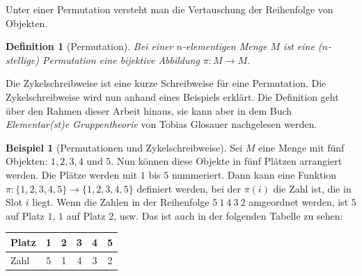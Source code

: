 \documentclass[12pt,a4paper, usenames, dvipsnames]{article}
\theoremstyle{mystyle}
\newtheorem{definition}{Definition}
\theoremstyle{definition}
\newtheorem{bsp}{Beispiel}[definition]
\begin{document}
Unter einer Permutation versteht man die Vertauschung der Reihenfolge von Objekten.

\begin{definition}[Permutation]
Bei einer $n$-elementigen Menge $M$ ist eine ($n$-stellige) Permutation eine bijektive Abbildung $\pi  : M \rightarrow M$.
\end{definition}
Die Zykelschreibweise ist eine kurze Schreibweise für eine Permutation.
Die Zykelschreibweise wird nun anhand eines Beispiels erklärt. Die Definition geht über den Rahmen dieser Arbeit hinaus, sie kann aber in dem Buch \textit{Elementar(st)e Gruppentheorie} von Tobias Glosauer \cite{Buch} nachgelesen werden.

\begin{bsp}[Permutationen und Zykelschreibweise]
Sei $M$ eine Menge mit fünf Objekten: $1, 2, 3, 4$ und $5$. Nun können diese Objekte in fünf Plätzen arrangiert werden. Die Plätze werden mit $1$ bis $5$ nummeriert. Dann kann eine Funktion $\pi :\{1,2,3,4,5\} \rightarrow \{1,2,3,4,5\}$ definiert werden, bei der $\pi (i)$ die Zahl ist, die in Slot $i$ liegt.
Wenn die Zahlen in der Reihenfolge $5 \ 1\ 4\ 3 \ 2$ amgeordnet werden, ist $5$ auf Platz $1$, $1$ auf Platz $2$, usw. Das ist auch in der folgenden Tabelle zu sehen: 

\begin{center}
\begin{tabular}{l ccccc}

Platz & 1 & 2 & 3 & 4 & 5 \\
\midrule
Zahl & 5 & 1 & 4 & 3 & 2 \\

\end{tabular}
\end{center}


\end{bsp}
\end{document}
